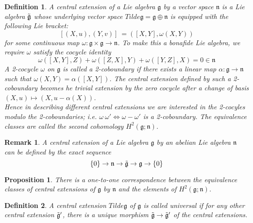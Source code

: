 \documentclass{article}
\newtheorem{defn}{Definition}
\newtheorem{prop}{Proposition}
\newtheorem{rmk}{Remark}
\begin{document}
\begin{defn}

	A \textit{central extension of a Lie algebra} $ \mathfrak{g}$ by a vector space $ \mathfrak{n}$ is a Lie algebra $ \Tilde{ \mathfrak{g}}$ whose underlying vector space $Tilde{ \mathfrak{g}} = \mathfrak{g} \oplus \mathfrak{n}$ is equipped with the following Lie bracket:
	\[	[ (X,u),(Y,v)]^{~} = ([X,Y], \omega(X,Y))	\]
for some continuous map $ \omega: \mathfrak{g} \times \mathfrak{g} \to \mathfrak{n}$. To make this a bonafide Lie algebra, we require $\omega$ satisfy the \textit{cocycle identity}
\[	\omega([X,Y],Z) + \omega([Z,X],Y) + \omega([Y,Z],X) = 0 \in \mathfrak{n}\]
A 2-cocycle $ \omega$ on $ \mathfrak{g}$ is called a \textit{2-coboundary} if there exists a linear map $ \alpha: \mathfrak{g} \to \mathfrak{n}$ such that $\omega(X,Y) = \alpha ([X,Y])$. The central extension defined by such a 2-coboundary becomes he trivial extension by the zero cocycle after a change of basis $ (X,u) \mapsto (X, u - \alpha(X))$.\\
\indent Hence in describing different central extensions we are interested in the 2-cocyles modulo the 2-coboundaries; i.e. $\omega ~ \omega ' \iff \omega - \omega '$ is a 2-coboundary. The equivalence classes are called the \textit{second cohomology} $H^2( \mathfrak{g}; \mathfrak{n})$. 
\end{defn}


\begin{rmk}

A central extension of a Lie algebra $ \mathfrak{g}$ by an abelian Lie algebra $ \mathfrak{n}$ can be defined by the exact sequence
\[
	\{0\} \to \mathfrak{n} \to \Tilde{ \mathfrak{g}} \to \mathfrak{g} \to \{0\}
\]

\end{rmk}


\begin{prop}

	There is a one-to-one correspondence between the equivalence classes of central extensions of $ \mathfrak{g}$ by $ \mathfrak{n}$ and the elements of $H^2( \mathfrak{g}; \mathfrak{n})$.

\end{prop}


\begin{defn}

	A central extension $Tilde{ \mathfrak{g}}$ of $ \mathfrak{g}$ is called \textit{universal} if for any other central extension $ \Tilde{ \mathfrak{g}}'$, there is a unique morphism $\Tilde{ \mathfrak{g}} \to \Tilde{ \mathfrak{g}}'$ of the central extensions.

\end{defn}
\end{document}
